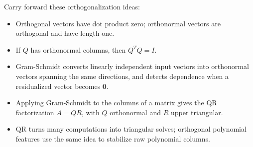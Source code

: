 Carry forward these orthogonalization ideas:
\begin{itemize}
    \item Orthogonal vectors have dot product zero; orthonormal vectors are orthogonal and have length one.
    \item If \(Q\) has orthonormal columns, then \(Q^TQ=I\).
    \item Gram-Schmidt converts linearly independent input vectors into orthonormal vectors spanning the same directions, and detects dependence when a residualized vector becomes \(\mathbf{0}\).
    \item Applying Gram-Schmidt to the columns of a matrix gives the QR factorization \(A=QR\), with \(Q\) orthonormal and \(R\) upper triangular.
    \item QR turns many computations into triangular solves; orthogonal polynomial features use the same idea to stabilize raw polynomial columns.
\end{itemize}
